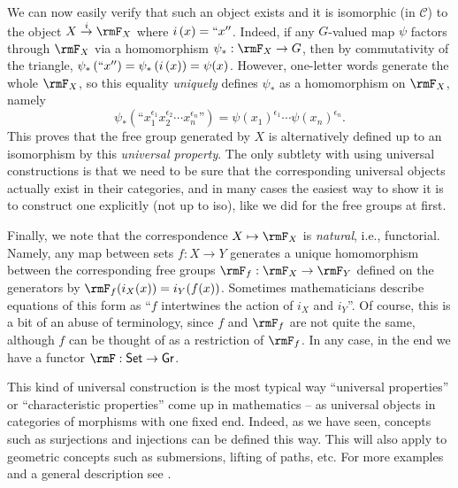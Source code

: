 \begin{example}
We can now easily verify that such an object exists and it is isomorphic
(in $\mathcal{C}$) to the object $X\overset{i}{\to}\rmF_{X}$ where
$i\left(x\right)=``x''$. Indeed, if any $G$-valued map $\psi$ factors
through $\rmF_{X}$ via a homomorphism $\psi_{\ast}:\rmF_{X}\to G$, then
by commutativity of the triangle, $\psi_{\ast}\left(``x''\right)=\psi_{\ast}\left(i\left(x\right)\right)=\psi(x)$.
However, one-letter words generate the whole $\rmF_{X}$, so this equality
\emph{uniquely} defines $\psi_{\ast}$ as a homomorphism on $\rmF_{X}$,
namely
\begin{equation}
\psi_{\ast}\left(\text{``}x_{1}^{\epsilon_{1}}x_{2}^{\epsilon_{2}}\cdots x_{n}^{\epsilon_{n}}\text{''}\right)=\psi\left(x_{1}\right)^{\epsilon_{1}}\cdots\psi\left(x_{n}\right)^{\epsilon_{n}}.
\end{equation}
This proves that the free group generated by $X$ is alternatively
defined up to an isomorphism by this \emph{universal property}.
The only subtlety with using universal constructions is that we need
to be sure that the corresponding universal objects actually exist
in their categories, and in many cases the easiest way to show it
is to construct one explicitly (not up to iso), like we did for the
free groups at first.

Finally, we note that the correspondence $X\mapsto \rmF_X$ is \emph{natural}, i.e., functorial. Namely, any map between sets $f:X\to Y$ generates a unique homomorphism between the corresponding free groups $\rmF_f:\rmF_X\to \rmF_Y$ defined on the generators by $\rmF_f (i_X(x))=i_Y(f(x))$. Sometimes mathematicians describe equations of this form as ``$f$ intertwines the action of $i_X$ and $i_Y$''. Of course, this is a bit of an abuse of terminology, since $f$ and $\rmF_f$ are not quite the same, although $f$ can be thought of as a restriction of $\rmF_f$. In any case, in the end we have a functor $\rmF:\mathsf{Set}\to\mathsf{Gr}$.
\end{example}

This kind of universal construction is the most typical way ``universal properties'' or ``characteristic properties'' come up in mathematics -- as universal objects in categories of morphisms with one fixed end. Indeed, as we have seen, concepts such as surjections and injections can be defined this way. This will also apply to geometric concepts such as submersions, lifting of paths, etc. For more examples and a general description see \cite[Exercise~7.8:24 and Def.~7.8:12]{Bergman}.

